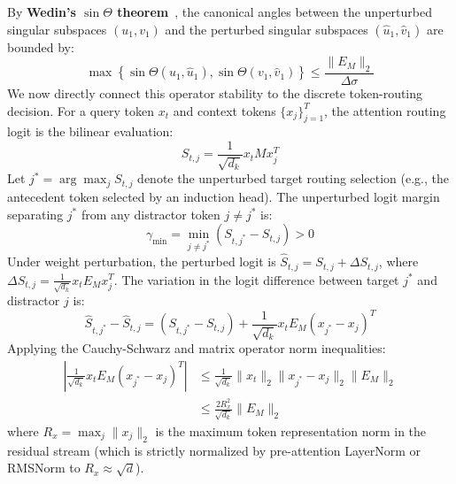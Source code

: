 \documentclass[10pt,twocolumn,letterpaper]{article}
\begin{document}
By \textbf{Wedin's $\sin\Theta$ theorem}~\cite{wedin1972perturbation}, the canonical angles between the unperturbed singular subspaces $(u_1, v_1)$ and the perturbed singular subspaces $(\widehat{u}_1, \widehat{v}_1)$ are bounded by:
\begin{equation}
    \max\left\{ \sin\Theta(u_1, \widehat{u}_1), \sin\Theta(v_1, \widehat{v}_1) \right\} \le \frac{\|E_M\|_2}{\Delta \sigma}
\end{equation}
We now directly connect this operator stability to the discrete token-routing decision. For a query token $x_t$ and context tokens $\{x_j\}_{j=1}^T$, the attention routing logit is the bilinear evaluation:
\begin{equation}
    S_{t, j} = \frac{1}{\sqrt{d_k}} x_t M x_j^T
\end{equation}
Let $j^* = \arg\max_j S_{t, j}$ denote the unperturbed target routing selection (e.g., the antecedent token selected by an induction head). The unperturbed logit margin separating $j^*$ from any distractor token $j \ne j^*$ is:
\begin{equation}
    \gamma_{\min} = \min_{j \ne j^*} \left( S_{t, j^*} - S_{t, j} \right) > 0
\end{equation}
Under weight perturbation, the perturbed logit is $\widehat{S}_{t, j} = S_{t, j} + \Delta S_{t, j}$, where $\Delta S_{t, j} = \frac{1}{\sqrt{d_k}} x_t E_M x_j^T$. The variation in the logit difference between target $j^*$ and distractor $j$ is:
\begin{equation}
    \widehat{S}_{t, j^*} - \widehat{S}_{t, j} = \left( S_{t, j^*} - S_{t, j} \right) + \frac{1}{\sqrt{d_k}} x_t E_M (x_{j^*} - x_j)^T
\end{equation}
Applying the Cauchy-Schwarz and matrix operator norm inequalities:
\begin{align}
    \left| \frac{1}{\sqrt{d_k}} x_t E_M (x_{j^*} - x_j)^T \right| &\le \frac{1}{\sqrt{d_k}} \|x_t\|_2 \|x_{j^*} - x_j\|_2 \|E_M\|_2 \nonumber\\
    &\le \frac{2 R_x^2}{\sqrt{d_k}} \|E_M\|_2
\end{align}
where $R_x = \max_j \|x_j\|_2$ is the maximum token representation norm in the residual stream (which is strictly normalized by pre-attention LayerNorm or RMSNorm to $R_x \approx \sqrt{d}$).
\end{document}
